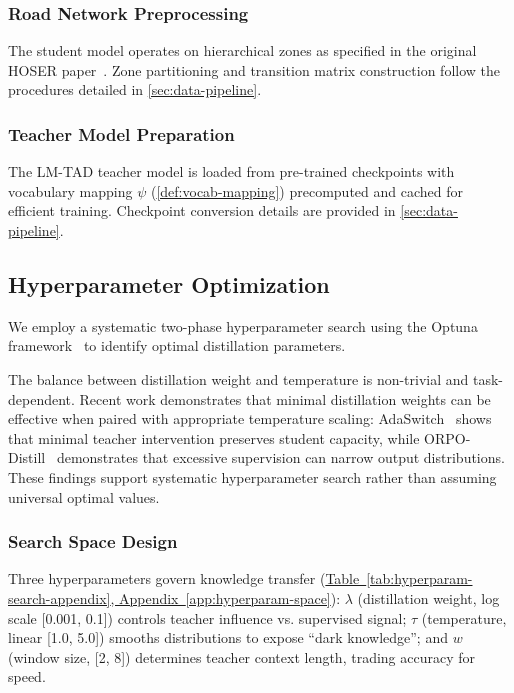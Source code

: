 \subsubsection{Road Network Preprocessing}

The student model operates on hierarchical zones as specified in the original HOSER paper~\cite{caoHolisticSemanticRepresentation2025}. Zone partitioning and transition matrix construction follow the procedures detailed in \autoref{sec:data-pipeline}.

\subsubsection{Teacher Model Preparation}

The LM-TAD teacher model is loaded from pre-trained checkpoints with vocabulary mapping $\psi$ (\autoref{def:vocab-mapping}) precomputed and cached for efficient training. Checkpoint conversion details are provided in \autoref{sec:data-pipeline}.

\subsection{Hyperparameter Optimization}
\label{sec:impl-hparam}

We employ a systematic two-phase hyperparameter search using the Optuna framework~\cite{akibaOptunaNextgenerationHyperparameter2019} to identify optimal distillation parameters.

The balance between distillation weight and temperature is non-trivial and task-dependent. Recent work demonstrates that minimal distillation weights can be effective when paired with appropriate temperature scaling: AdaSwitch~\cite{pengAdaSwitchAdaptiveSwitching2025} shows that minimal teacher intervention preserves student capacity, while ORPO-Distill~\cite{singhORPODistillMixedPolicyPreference2025} demonstrates that excessive supervision can narrow output distributions. These findings support systematic hyperparameter search rather than assuming universal optimal values.

\subsubsection{Search Space Design}

Three hyperparameters govern knowledge transfer (\hyperref[app:hyperparam-space]{Table~\ref*{tab:hyperparam-search-appendix}, Appendix~\ref*{app:hyperparam-space}}): $\lambda$ (distillation weight, log scale [0.001, 0.1]) controls teacher influence vs. supervised signal; $\tau$ (temperature, linear [1.0, 5.0]) smooths distributions to expose ``dark knowledge''; and $w$ (window size, [2, 8]) determines teacher context length, trading accuracy for speed.

